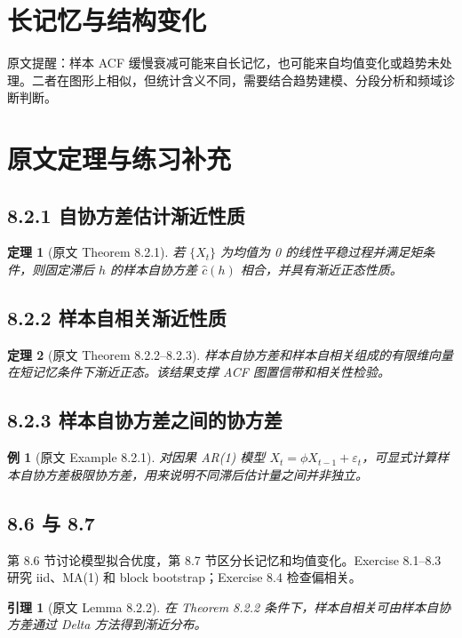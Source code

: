 \documentclass[11pt,a4paper,openany]{ctexbook}
\newtheorem{theorem}{定理}[section]
\newtheorem{lemma}{引理}[section]
\newtheorem{example}{例}[section]
\begin{document}
\section{长记忆与结构变化}

原文提醒：样本 ACF 缓慢衰减可能来自长记忆，也可能来自均值变化或趋势未处理。二者在图形上相似，但统计含义不同，需要结合趋势建模、分段分析和频域诊断判断。

\section{原文定理与练习补充}

\subsection{8.2.1 自协方差估计渐近性质}
\begin{theorem}[原文 Theorem 8.2.1]
若 \(\{X_t\}\) 为均值为 0 的线性平稳过程并满足矩条件，则固定滞后 \(h\) 的样本自协方差 \(\hat c(h)\) 相合，并具有渐近正态性质。
\end{theorem}

\subsection{8.2.2 样本自相关渐近性质}
\begin{theorem}[原文 Theorem 8.2.2--8.2.3]
样本自协方差和样本自相关组成的有限维向量在短记忆条件下渐近正态。该结果支撑 ACF 图置信带和相关性检验。
\end{theorem}

\subsection{8.2.3 样本自协方差之间的协方差}
\begin{example}[原文 Example 8.2.1]
对因果 AR(1) 模型 \(X_t=\phi X_{t-1}+\varepsilon_t\)，可显式计算样本自协方差极限协方差，用来说明不同滞后估计量之间并非独立。
\end{example}

\subsection{8.6 与 8.7}
第 8.6 节讨论模型拟合优度，第 8.7 节区分长记忆和均值变化。Exercise 8.1--8.3 研究 iid、MA(1) 和 block bootstrap；Exercise 8.4 检查偏相关。

\begin{lemma}[原文 Lemma 8.2.2]
在 Theorem 8.2.2 条件下，样本自相关可由样本自协方差通过 Delta 方法得到渐近分布。
\end{lemma}
\end{document}
